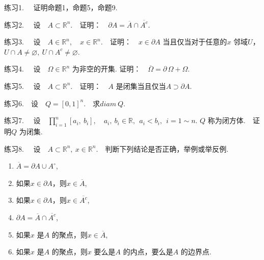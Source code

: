 \documentclass{article}
\begin{document}
\newpage

\noindent 练习1. \ \ 证明命题1，命题5，命题9.

\vspace{20pt}

\noindent 练习2. \ \ 设\ \ \(A \subset \mathbb{R}^n\).\ \ 证明：\ \ \(\partial A = \overline{A}\cap \overline{A^c}\).

\vspace{20pt}

\noindent 练习3. \ \ 设\ \ \(A \in \mathbb{R}^n,\quad x \in \mathbb{R}^n\).\ \ 证明：\ \ \(x \in \partial A\) 当且仅当对于任意的\(x\) 邻域\(U\)，\(U \cap A \neq \varnothing ,\ U \cap A^c \neq \varnothing \).

\vspace{20pt}

\noindent 练习4. \ \ 设\ \ \(\Omega \in \mathbb{R}^n\) 为非空的开集. 证明：\ \ \(\overline{\Omega} = \partial\,\Omega +\Omega\).

\vspace{20pt}

\noindent 练习5. \ \ 设\ \ \(A \subset \mathbb{R}^n\).\ \ 证明：\ \ \(A\) 是闭集当且仅当\(A \supset \partial A\).

\vspace{20pt}

\noindent 练习6.\ \ 设\ \ \(Q =[0,1]^n\).\ \ 求\(diam\ Q\).

\vspace{20pt}

\noindent 练习7. \ \ 设\ \ \(\prod_{i=1}^n [a_i,\ b_i],\quad a_i,\ b_i \in \mathbb{R},\ \ a_i < b_i,\ \ i = 1 \sim n\). \(Q\) 称为闭方体.\ \ 证明\(Q\) 为闭集.

\vspace{20pt}

\noindent 练习8. \ \ 设\ \ \(A \subset \mathbb{R}^n,\ x \in \mathbb{R}^n\).\ \ 判断下列结论是否正确，举例或举反例.
\begin{enumerate}
    \item \(\overline{A} =\partial A \cup A^{\circ }\),
    \item 如果\(x \in \partial A\)，则\(x \in \overline{A}\),
    \item 如果\(x \in \partial A\)，则\(x \in \overline{A^c}\),
    \item \(\partial A = \overline{A}\cap \overline{A^c}\),
    \item 如果\(x\) 是\(A\) 的聚点，则\(x \in \overline{A}\),
    \item 如果\(x\) 是\(A\) 的聚点，则\(x\) 要么是\(A\) 的内点，要么是\(A\) 的边界点.
\end{enumerate}
\end{document}
